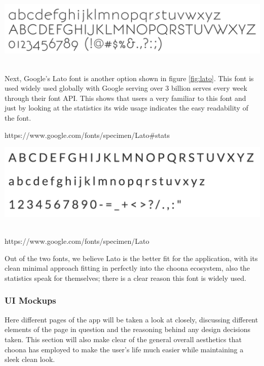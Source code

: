 \begin{minipage}{\linewidth}
\centering
\includegraphics[scale=0.55]{./img/bonvenocf.png}
\label{fig:Bonvenocf}
\end{minipage}\\

Next, Google's Lato font is another option shown in figure \ref{fig:lato}. This font is used widely used globally with Google serving over 3 billion serves every week through their font API. This shows that users a very familiar to this font and just by looking at the statistics its wide usage indicates the easy readability of the font.

https://www.google.com/fonts/specimen/Lato\#stats \\

\begin{minipage}{\linewidth}
\centering
\includegraphics[scale=0.65]{./img/lato.png}
\label{fig:lato}
\end{minipage}\\

https://www.google.com/fonts/specimen/Lato

Out of the two fonts, we believe Lato is the better fit for the application, with its clean minimal approach fitting in perfectly into the choona ecosystem, also the statistics speak for themselves; there is a clear reason this font is widely used.\\

\subsubsection*{UI Mockups}

Here different pages of the app will be taken a look at closely, discussing different elements of the page in question and the reasoning behind any design decisions taken. This section will also make clear of the general overall aesthetics that choona has employed to make the user's life much easier while maintaining a sleek clean look.\\

